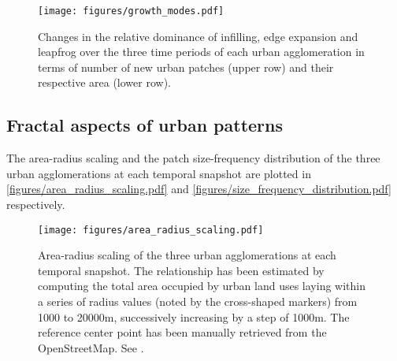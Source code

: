 \documentclass[10pt,letterpaper]{article}
\begin{document}
\begin{figure}[!ht]
  \begin{adjustwidth}{-.4\textwidth}{0cm}
    \centering  
    \texttt{[image: figures/growth\_modes.pdf]}
    \vspace{.5em}
    \caption[Three growth modes]{\label{figures/growth_modes.pdf}Changes in the relative dominance of infilling, edge expansion and leapfrog over the three time periods of each urban agglomeration in terms of number of new urban patches (upper row) and their respective area (lower row).}
  \end{adjustwidth}
\end{figure}


\subsection*{Fractal aspects of urban patterns}

The area-radius scaling and the patch size-frequency distribution of the three urban agglomerations at each temporal snapshot are plotted in \autoref{figures/area_radius_scaling.pdf} and \autoref{figures/size_frequency_distribution.pdf} respectively.

\begin{figure}[!ht]
  \begin{adjustwidth}{-.4\textwidth}{0cm}
    \centering
    \texttt{[image: figures/area\_radius\_scaling.pdf]}
    \vspace{.5em}
    \caption[Area-radius scaling]{\label{figures/area_radius_scaling.pdf}Area-radius scaling of the three urban agglomerations at each temporal snapshot. The relationship has been estimated by computing the total area occupied by urban land uses laying within a series of radius values (noted by the cross-shaped markers) from 1000 to 20000m, successively increasing by a step of 1000m. The reference center point has been manually retrieved from the OpenStreetMap\footnotemark. See .} %
  \end{adjustwidth}
\end{figure}

\end{document}
